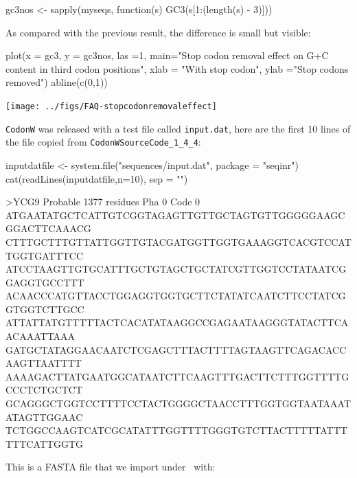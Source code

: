 \documentclass{article}
\begin{document}
\begin{Schunk}
\begin{Sinput}
 gc3nos <- sapply(myseqs, function(s) GC3(s[1:(length(s) - 3)]))
\end{Sinput}
\end{Schunk}

As compared with the previous result, the difference is small but visible:

\begin{Schunk}
\begin{Sinput}
 plot(x = gc3, y = gc3nos, las =1, main="Stop codon removal effect on G+C content
 in third codon positions", xlab = "With stop codon", ylab ="Stop codons removed")
 abline(c(0,1))
\end{Sinput}
\end{Schunk}
\texttt{[image: ../figs/FAQ-stopcodonremovaleffect]}

\texttt{CodonW} was released with a test file called \texttt{input.dat}, here are
the first 10 lines of the file copied from \texttt{CodonWSourceCode\_1\_4\_4}:

\begin{Schunk}
\begin{Sinput}
 inputdatfile <- system.file("sequences/input.dat", package = "seqinr")
 cat(readLines(inputdatfile,n=10), sep = "\n")
\end{Sinput}
\begin{Soutput}
>YCG9 Probable          1377 residues Pha 0 Code 0
ATGAATATGCTCATTGTCGGTAGAGTTGTTGCTAGTGTTGGGGGAAGCGGACTTCAAACG
CTTTGCTTTGTTATTGGTTGTACGATGGTTGGTGAAAGGTCACGTCCATTGGTGATTTCC
ATCCTAAGTTGTGCATTTGCTGTAGCTGCTATCGTTGGTCCTATAATCGGAGGTGCCTTT
ACAACCCATGTTACCTGGAGGTGGTGCTTCTATATCAATCTTCCTATCGGTGGTCTTGCC
ATTATTATGTTTTTACTCACATATAAGGCCGAGAATAAGGGTATACTTCAACAAATTAAA
GATGCTATAGGAACAATCTCGAGCTTTACTTTTAGTAAGTTCAGACACCAAGTTAATTTT
AAAAGACTTATGAATGGCATAATCTTCAAGTTTGACTTCTTTGGTTTTGCCCTCTGCTCT
GCAGGGCTGGTCCTTTTCCTACTGGGGCTAACCTTTGGTGGTAATAAATATAGTTGGAAC
TCTGGCCAAGTCATCGCATATTTGGTTTTGGGTGTCTTACTTTTTATTTTTTCATTGGTG
\end{Soutput}
\end{Schunk}

This is a FASTA file that we import under \Rlogo{}~with:
\end{document}
